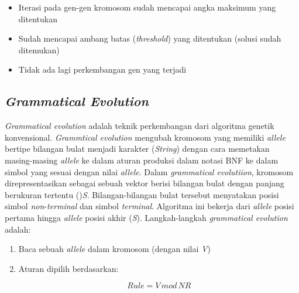 \begin{enumerate}[1.]
\begin{itemize}
		\item Iterasi pada gen-gen kromosom sudah mencapai angka maksimum yang ditentukan
		\item Sudah mencapai ambang batas (\textit{threshold}) yang ditentukan (solusi sudah ditemukan)
		\item Tidak ada lagi perkembangan gen yang terjadi

	\end{itemize}

\end{enumerate}

\subsection{\textit{Grammatical Evolution}} %
\label{sec:EG}

\textit{Grammatical evolution} adalah teknik perkembangan dari algoritma genetik konvensional. \textit{Grammtical evolution} mengubah kromosom yang memiliki \textit{allele} bertipe bilangan bulat menjadi karakter (\textit{String}) dengan cara memetakan masing-masing
\textit{allele} ke dalam aturan produksi dalam notasi BNF ke dalam simbol yang sesuai dengan nilai \textit{allele}. Dalam \textit{grammatical evolutiion}, kromosom direpresentasikan sebagai sebuah vektor berisi bilangan bulat dengan panjang berukuran tertentu ()\textit{S}.
Bilangan-bilangan bulat tersebut menyatakan posisi simbol \textit{non}-\textit{terminal} dan simbol \textit{terminal}. Algoritma ini bekerja dari \textit{allele} posisi pertama hingga \textit{allele} posisi akhir (\textit{S}). Langkah-langkah \textit{grammatical evolution} adalah:


\begin{enumerate}[1.]

\item Baca sebuah \textit{allele} dalam kromosom (dengan nilai \textit{V})
\item Aturan dipilih berdasarkan:

\begin{equation} Rule = \textit{V} \, mod \, NR \end{equation}

\end{enumerate}

